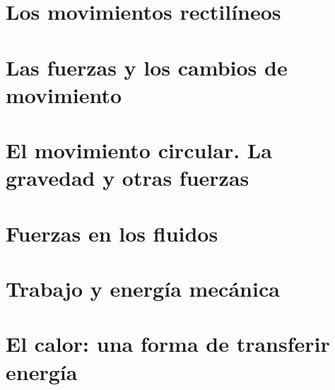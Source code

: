 \documentclass[
    11pt, %
    fleqn, %
    a4paper, %
]{LegrandOrangeBookES}
\begin{document}
    \chapter{Los movimientos rectilíneos}

    



    \chapter{Las fuerzas y los cambios de movimiento}

    



    \chapter{El movimiento circular. La gravedad y otras fuerzas}

    



    \chapter{Fuerzas en los fluidos}

    



    \chapter{Trabajo y energía mecánica}

    



    \chapter{El calor: una forma de transferir energía}
\end{document}
